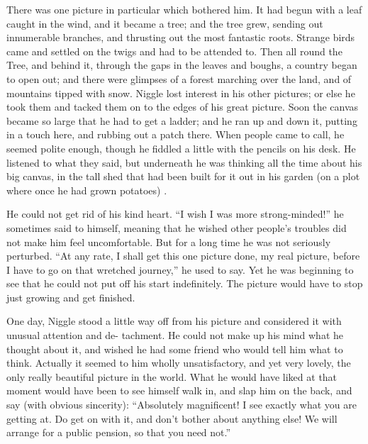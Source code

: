 \documentclass[english]{scrartcl}
\begin{document}
There was one picture in particular which bothered him. It had begun with a leaf caught in the wind, and it became a tree; and the tree grew, sending out innumerable branches, and thrusting out the most fantastic roots. Strange birds came and settled on the twigs and had to be attended to. Then all round the Tree, and behind it, through the gaps in the leaves and boughs, a country began to open out; and there were glimpses of a forest marching over the land, and of mountains tipped with snow. Niggle lost interest in his other pictures; or else he took them and tacked them on to the edges of his great picture. Soon the canvas became so large that he had to get a ladder; and he ran up and down it, putting in a touch here, and rubbing out a patch there. When people came to call, he seemed polite enough, though he fiddled a little with the pencils on his desk. He listened to what they said, but underneath he was thinking all the time about his big canvas, in the tall shed that had been built for it out in his garden (on a plot where once he had grown potatoes) .

He could not get rid of his kind heart. “I wish I was more strong-minded!” he sometimes said to himself, meaning that he wished other people’s troubles did not make him feel uncomfortable. But for a long time he was not seriously perturbed. “At any rate, I shall get this one picture done, my real picture, before I have to go on that wretched journey,” he used to say. Yet he was beginning to see that he could not put off his start indefinitely. The picture would have to stop just growing and get finished.

One day, Niggle stood a little way off from his picture and considered it with unusual attention and de- tachment. He could not make up his mind what he thought about it, and wished he had some friend who would tell him what to think. Actually it seemed to him wholly unsatisfactory, and yet very lovely, the only really beautiful picture in the world. What he would have liked at that moment would have been to see himself walk in, and slap him on the back, and say (with obvious sincerity): “Absolutely magnificent! I see exactly what you are getting at. Do get on with it, and don’t bother about anything else! We will arrange for a public pension, so that you need not.”
\end{document}
